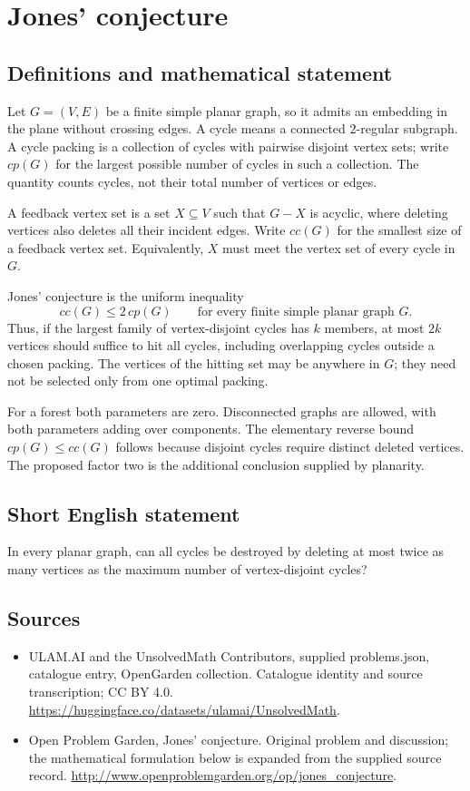 \documentclass[11pt,a4paper]{article}
\begin{document}
\section*{Jones' conjecture}\label{statement}

\subsection{Definitions and mathematical statement}
Let $G=(V,E)$ be a finite simple planar graph, so it admits
an embedding in the plane without crossing edges. A cycle
means a connected $2$-regular subgraph. A cycle packing is
a collection of cycles with pairwise disjoint vertex sets;
write $cp(G)$ for the largest possible number of cycles in
such a collection. The quantity counts cycles, not their
total number of vertices or edges.

A feedback vertex set is a set $X\subseteq V$ such that
$G-X$ is acyclic, where deleting vertices also deletes all
their incident edges. Write $cc(G)$ for the smallest size
of a feedback vertex set. Equivalently, $X$ must meet the
vertex set of every cycle in $G$.

Jones' conjecture is the uniform inequality
\[
 cc(G)\leq2\,cp(G)
 \qquad\text{for every finite simple planar graph }G.
\]
Thus, if the largest family of vertex-disjoint cycles has
$k$ members, at most $2k$ vertices should suffice to hit all
cycles, including overlapping cycles outside a chosen packing.
The vertices of the hitting set may be anywhere in $G$;
they need not be selected only from one optimal packing.

For a forest both parameters are zero. Disconnected graphs
are allowed, with both parameters adding over components.
The elementary reverse bound $cp(G)\leq cc(G)$ follows
because disjoint cycles require distinct deleted vertices.
The proposed factor two is the additional conclusion
supplied by planarity.
\subsection{Short English statement}
In every planar graph, can all cycles be destroyed by deleting at most twice as many vertices as the maximum number of vertex-disjoint cycles?
\subsection{Sources}
\begin{itemize}
\item[S1] ULAM.AI and the UnsolvedMath Contributors, supplied problems.json, catalogue entry, OpenGarden collection. Catalogue identity and source transcription; CC BY 4.0.
\url{https://huggingface.co/datasets/ulamai/UnsolvedMath}.
\item[S2] Open Problem Garden, Jones' conjecture. Original problem and discussion; the mathematical formulation below is expanded from the supplied source record.
\url{http://www.openproblemgarden.org/op/jones_conjecture}.
\end{itemize}
\end{document}
